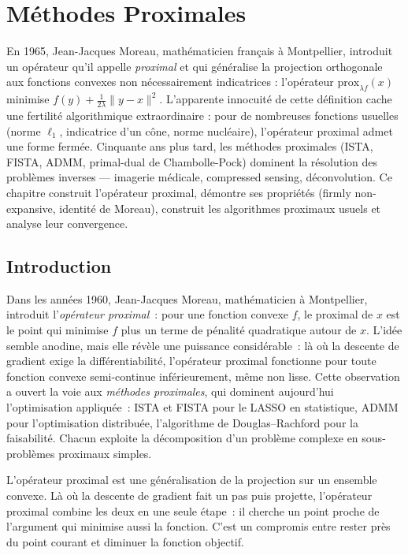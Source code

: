 \chapter{M\'ethodes Proximales}
\label{ch:proximales}

En 1965, Jean-Jacques Moreau, mathématicien français à Montpellier, introduit un opérateur qu'il appelle \emph{proximal} et qui généralise la projection orthogonale aux fonctions convexes non nécessairement indicatrices : l'opérateur $\mathrm{prox}_{\lambda f}(x)$ minimise $f(y) + \frac{1}{2\lambda}\|y-x\|^2$. L'apparente innocuité de cette définition cache une fertilité algorithmique extraordinaire : pour de nombreuses fonctions usuelles (norme $\ell_1$, indicatrice d'un cône, norme nucléaire), l'opérateur proximal admet une forme fermée. Cinquante ans plus tard, les méthodes proximales (ISTA, FISTA, ADMM, primal-dual de Chambolle-Pock) dominent la résolution des problèmes inverses --- imagerie médicale, compressed sensing, déconvolution. Ce chapitre construit l'opérateur proximal, démontre ses propriétés (firmly non-expansive, identité de Moreau), construit les algorithmes proximaux usuels et analyse leur convergence.

\section{Introduction}

Dans les ann\'ees 1960, Jean-Jacques Moreau, math\'ematicien \`a Montpellier, introduit l'\emph{op\'erateur proximal}~: pour une fonction convexe $f$, le proximal de $x$ est le point qui minimise $f$ plus un terme de p\'enalit\'e quadratique autour de $x$. L'id\'ee semble anodine, mais elle r\'ev\`ele une puissance consid\'erable~: l\`a o\`u la descente de gradient exige la diff\'erentiabilit\'e, l'op\'erateur proximal fonctionne pour toute fonction convexe semi-continue inf\'erieurement, m\^eme non lisse. Cette observation a ouvert la voie aux \emph{m\'ethodes proximales}, qui dominent aujourd'hui l'optimisation appliqu\'ee~: ISTA et FISTA pour le LASSO en statistique, ADMM pour l'optimisation distribu\'ee, l'algorithme de Douglas--Rachford pour la faisabilit\'e. Chacun exploite la d\'ecomposition d'un probl\`eme complexe en sous-probl\`emes proximaux simples.

\begin{intuition}
L'op\'erateur proximal est une g\'en\'eralisation de la projection sur un
ensemble convexe. L\`a o\`u la descente de gradient fait un pas puis projette,
l'op\'erateur proximal combine les deux en une seule \'etape~: il cherche un
point proche de l'argument qui minimise aussi la fonction. C'est un compromis
entre rester pr\`es du point courant et diminuer la fonction objectif.
\end{intuition}

